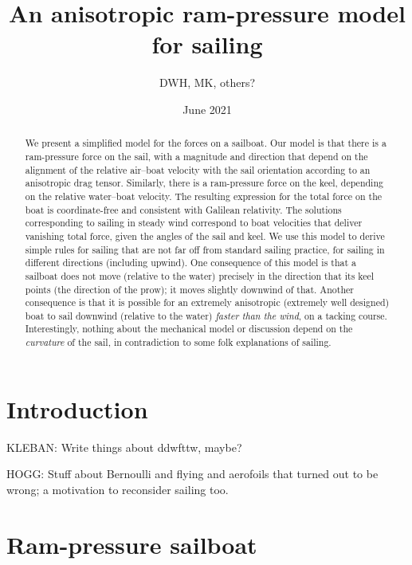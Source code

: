 \documentclass{article}
\title{\bfseries%
An anisotropic ram-pressure model for sailing}
\author{DWH, MK, others?}
\date{June 2021}
\begin{document}
\maketitle

\begin{abstract}\noindent
    We present a simplified model for the forces on a sailboat.
    Our model is that there is a ram-pressure force on the sail, with a magnitude and direction that depend on the alignment of the relative air--boat velocity with the sail orientation according to an anisotropic drag tensor.
    Similarly, there is a ram-pressure force on the keel, depending on the relative water--boat velocity.
    The resulting expression for the total force on the boat is coordinate-free and consistent with Galilean relativity.
    The solutions corresponding to sailing in steady wind correspond to boat velocities that deliver vanishing total force, given the angles of the sail and keel.
    We use this model to derive simple rules for sailing that are not far off from standard sailing practice, for sailing in different directions (including upwind).
    One consequence of this model is that a sailboat does not move (relative to the water) precisely in the direction that its keel points (the direction of the prow); it moves slightly downwind of that.
    Another consequence is that it is possible for an extremely anisotropic (extremely well designed) boat to sail downwind (relative to the water) \emph{faster than the wind}, on a tacking course.
    Interestingly, nothing about the mechanical model or discussion depend on the \emph{curvature} of the sail, in contradiction to some folk explanations of sailing.
\end{abstract}

\section{Introduction}

KLEBAN: Write things about ddwfttw, maybe?

HOGG: Stuff about Bernoulli and flying and aerofoils that turned out to be wrong; a motivation to reconsider sailing too.

\section{Ram-pressure sailboat}
\end{document}
